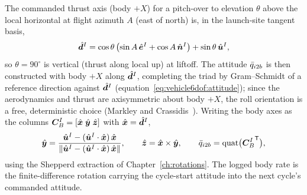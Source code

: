 The commanded thrust axis (body $+X$) for a pitch-over to elevation $\theta$
above the local horizontal at flight azimuth $A$ (east of north) is, in the
launch-site tangent basis,
\begin{equation}
  \hat{\bm{d}}^{I} = \cos\theta\,
    \bigl(\sin A\,\hat{\bm{e}}^{I} + \cos A\,\hat{\bm{n}}^{I}\bigr)
    + \sin\theta\,\hat{\bm{u}}^{I},
  \label{eq:vehicle6dof:pitchaxis}
\end{equation}
so $\theta = 90^{\circ}$ is vertical (thrust along local up) at liftoff. The
attitude $\bar{q}_{i2b}$ is then constructed with body $+X$ along
$\hat{\bm{d}}^{I}$, completing the triad by Gram--Schmidt of a reference
direction against $\hat{\bm{d}}^{I}$
(equation~\eqref{eq:vehicle6dof:attitude}); since the aerodynamics and thrust
are axisymmetric about body $+X$, the roll orientation is a free,
deterministic choice (Markley and Crassidis~\cite{markley2014}). Writing the
body axes as the columns $\bm{C}_{B}^{I} = [\hat{\bm{x}}\;\hat{\bm{y}}\;
\hat{\bm{z}}]$ with $\hat{\bm{x}} = \hat{\bm{d}}^{I}$,
\begin{equation}
  \hat{\bm{y}} = \frac{\hat{\bm{u}}^{I}
    - (\hat{\bm{u}}^{I}\cdot\hat{\bm{x}})\,\hat{\bm{x}}}
    {\left\lVert \hat{\bm{u}}^{I}
    - (\hat{\bm{u}}^{I}\cdot\hat{\bm{x}})\,\hat{\bm{x}} \right\rVert},
  \qquad
  \hat{\bm{z}} = \hat{\bm{x}} \times \hat{\bm{y}},
  \qquad
  \bar{q}_{i2b} = \mathrm{quat}\bigl({\bm{C}_{B}^{I}}^{\mathsf T}\bigr),
  \label{eq:vehicle6dof:attitude}
\end{equation}
using the Shepperd extraction of Chapter~\ref{ch:rotations}. The logged body
rate is the finite-difference rotation carrying the cycle-start attitude into
the next cycle's commanded attitude.

